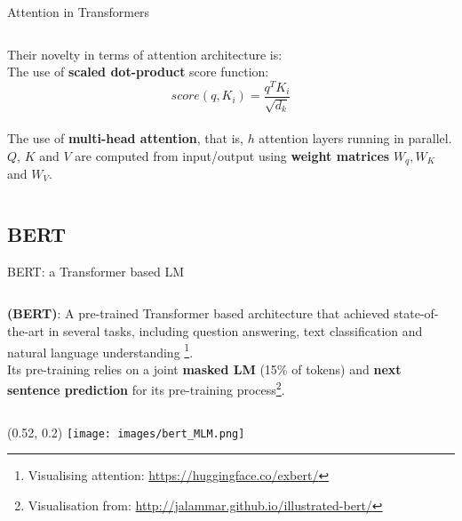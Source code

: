 \documentclass[UKenglish]{beamer}
\begin{document}
\begin{frame}{Attention in Transformers}
\begin{columns}[onlytextwidth]
    \begin{column}{0.50\textwidth}
    Their novelty in terms of attention architecture is:\\
    The use of \textbf{scaled dot-product} score function:
    \vspace{0.15cm}
    $$score(q,K_i) = \displaystyle \frac{q^TK_i}{\sqrt{d_k}} $$ \\
    The use of \textbf{multi-head attention}, that is, $h$ attention layers running in parallel.\vspace{0.15cm}\\
    $Q$, $K$ and $V$ are computed from input/output using \textbf{weight matrices} $W_q, W_K$ and $W_V$.
    \end{column}
\end{columns}
\end{frame}
\subsection{BERT}
\begin{frame}{BERT: a Transformer based LM}
\begin{columns}
    \begin{column}{0.45\textwidth}
    \textbf{(BERT)}: A pre-trained Transformer based architecture that achieved state-of-the-art in several tasks, including question answering, text classification and natural language understanding \cite{bert}\footnote{Visualising attention: \url{https://huggingface.co/exbert/}}.
\vspace{0.3cm}\\ Its pre-training relies on a joint \textbf{masked LM} (15\% of tokens) and \textbf{next sentence prediction} for its pre-training process\footnote{Visualisation from: \url{http://jalammar.github.io/illustrated-bert/}}.
    \end{column}
\end{columns}
\begin{textblock}{0.5}(0.52, 0.2)
        \texttt{[image: images/bert\_MLM.png]}
\end{textblock}
\end{frame}
\end{document}
